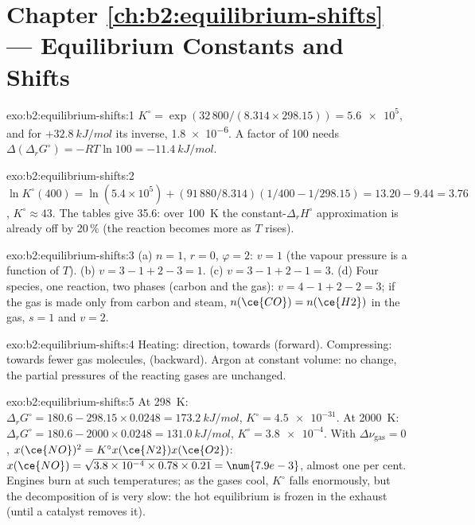 \section*{Chapter \ref{ch:b2:equilibrium-shifts} --- Equilibrium Constants and Shifts}

\begin{solution}{exo:b2:equilibrium-shifts:1}
$K^\circ = \exp(32\,800/(8.314 \times 298.15)) = \num{5.6e5}$, and for
$+\qty{32.8}{kJ/mol}$ its inverse, \num{1.8e-6}. A factor of 100 needs
$\Delta(\Delta_r G^\circ) = -RT\ln 100 = \qty{-11.4}{kJ/mol}$.
\end{solution}

\begin{solution}{exo:b2:equilibrium-shifts:2}
$\ln K^\circ(400) = \ln(5.4 \times 10^5) + (91\,880/8.314)(1/400 -
1/298.15) = 13.20 - 9.44 = 3.76$, $K^\circ \approx 43$. The tables give 35.6:
over \qty{100}{K} the constant-$\Delta_r H^\circ$ approximation is already
off by 20\,\% (the reaction becomes more  as $T$ rises).
\end{solution}

\begin{solution}{exo:b2:equilibrium-shifts:3}
(a) $n = 1$, $r = 0$, $\varphi = 2$: $v = 1$ (the vapour pressure is a function
of $T$). (b) $v = 3 - 1 + 2 - 3 = 1$. (c) $v = 3 - 1 + 2 - 1 = 3$. (d) Four
species, one reaction, two phases (carbon and the gas): $v = 4 - 1 + 2 - 2 =
3$; if the gas is made only from carbon and steam, $n(\ce{CO}) = n(\ce{H2})$
in the gas, $s = 1$ and $v = 2$.
\end{solution}

\begin{solution}{exo:b2:equilibrium-shifts:4}
Heating:  direction, towards  (forward). Compressing:
towards fewer gas molecules,  (backward). Argon at constant volume:
no change, the partial pressures of the reacting gases are unchanged.
\end{solution}

\begin{solution}{exo:b2:equilibrium-shifts:5}
At \qty{298}{K}: $\Delta_r G^\circ = 180.6 - 298.15 \times 0.0248 =
\qty{173.2}{kJ/mol}$, $K^\circ = \num{4.5e-31}$. At \qty{2000}{K}: $\Delta_r
G^\circ = 180.6 - 2000 \times 0.0248 = \qty{131.0}{kJ/mol}$, $K^\circ =
\num{3.8e-4}$. With $\Delta\nu_{\text{gas}} = 0$, $x(\ce{NO})^2 = K^\circ x(\ce{N2})
x(\ce{O2})$: $x(\ce{NO}) = \sqrt{3.8 \times 10^{-4} \times 0.78 \times 0.21} =
\num{7.9e-3}$, almost one per cent. Engines burn at such temperatures; as the
gases cool, $K^\circ$ falls enormously, but the decomposition of  is
very slow: the hot equilibrium is frozen in the exhaust (until a catalyst
removes it).
\end{solution}

